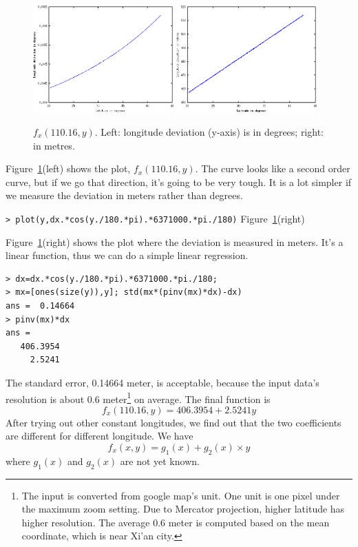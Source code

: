 \documentclass[a4paper]{article}
\begin{document}
\begin{figure}[htb]
\begin{center}
\includegraphics[width=0.48\textwidth]{fxy-degree.png}
\includegraphics[width=0.48\textwidth]{fxy-metre.png}
\end{center}
\caption{$f_x(110.16,y)$. Left: longitude deviation (y-axis) is in degrees;
right: in metres.}
\label{fig:fxy-degree}
\end{figure}

Figure~\ref{fig:fxy-degree}(left) shows the plot, $f_x(110.16,y)$. The curve
looks like a second order curve, but if we go that direction, it's going to be
very tough.
It is a lot simpler if we measure the deviation in meters rather
than degrees.

\noindent
\verb|> plot(y,dx.*cos(y./180.*pi).*6371000.*pi./180)| \hfill
Figure~\ref{fig:fxy-degree}(right)

Figure~\ref{fig:fxy-degree}(right) shows the plot where the deviation is
measured in meters.
It's a linear function, thus we can do a simple linear regression.
\begin{verbatim}
> dx=dx.*cos(y./180.*pi).*6371000.*pi./180;
> mx=[ones(size(y)),y]; std(mx*(pinv(mx)*dx)-dx)
ans =  0.14664
> pinv(mx)*dx
ans =
   406.3954
     2.5241
\end{verbatim}
The standard error, 0.14664 meter, is acceptable, because the input data's
resolution is about 0.6 meter\footnote{The input is converted from google map's
unit. One unit is one pixel under the maximum zoom setting. Due to Mercator
projection, higher latitude has higher resolution. The average 0.6 meter is
computed based on the mean coordinate, which is near Xi'an city.} on average.
The final function is
\begin{equation}
f_x(110.16,y)=406.3954+2.5241y
\end{equation}
After trying out other constant longitudes,
we find out that the two coefficients are different for different longitude.
We have
\begin{equation}
\label{eq:fxy}
f_x(x,y)=g_1(x)+g_2(x)\times y
\end{equation}
where $g_1(x)$ and $g_2(x)$ are not yet known.
\end{document}
